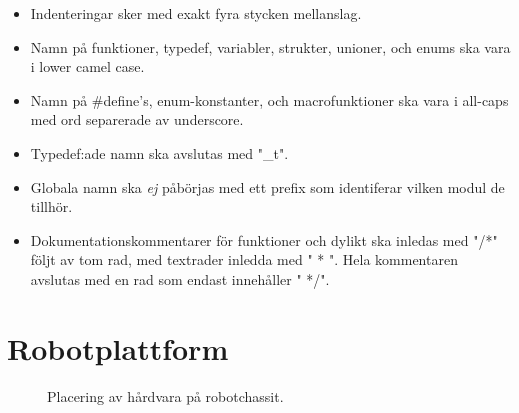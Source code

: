 \documentclass[a4paper,11pt]{article}
\begin{document}
\begin{appendices}
\begin{itemize}
    \item Indenteringar sker med exakt fyra stycken mellanslag.
    \item Namn på funktioner, typedef, variabler, strukter, unioner, och enums ska vara i lower camel case.
    \item Namn på \#define's, enum-konstanter, och macrofunktioner ska vara i all-caps med ord separerade av underscore.
    \item Typedef:ade namn ska avslutas med "\_t".
    \item Globala namn ska \textit{ej} påbörjas med ett prefix som identiferar vilken modul de tillhör.
    \item Dokumentationskommentarer för funktioner och dylikt ska inledas med "/*" följt av tom rad, med textrader inledda med "{ }* ". Hela kommentaren avslutas med en rad som endast innehåller "{ }*/".
\end{itemize}

\clearpage
\section{Robotplattform}
\label{app:placement}
\begin{figure}[h!]
    \caption{Placering av hårdvara på robotchassit.}
    \label{fig:placement}
\end{figure}
\end{appendices}

\clearpage
{} %
\printbibliography
\end{document}
